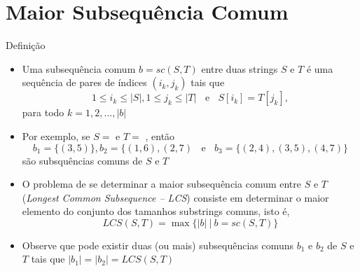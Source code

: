 \section{Maior Subsequência Comum}

\begin{frame}[fragile]{Definição}

    \begin{itemize}
        \item Uma subsequência comum $b = sc(S, T)$ entre duas strings $S$ e $T$ é uma sequência de
            pares de índices $(i_k, j_k)$ tais que 
        \[
            1\leq i_k\leq |S|, 1\leq j_k\leq |T| \ \ \ \ \mbox{e}\ \ \ \ S[i_k] = T[j_k],
        \]para todo $k = 1, 2, \ldots, |b|$

        \item  Por exemplo, se $S = $  e $T = $ , então
        \[
            b_1 = \lbrace (3, 5)\rbrace, b_2 = \lbrace (1, 6), (2, 7)\ \ \ \ \mbox{e}\ \ \ \ b_3 = \lbrace (2, 4), (3, 5), (4, 7)\rbrace
        \] são subsquências comuns de $S$ e $T$

        \item O problema de se determinar a maior subsequência comum entre $S$ e $T$
            (\textit{Longest Common Subsequence -- LCS}) consiste em determinar o maior
            elemento do conjunto dos tamanhos substrings comuns, isto é,
        \[
            LCS(S, T) = \max \lbrace |b|\ | \ b = sc(S, T)\rbrace
        \]

        \item Observe que pode existir duas (ou mais)
            subsequências comuns $b_1$ e $b_2$ de $S$ e $T$ tais que $|b_1| = |b_2| = LCS(S, T)$

    \end{itemize}

\end{frame}


